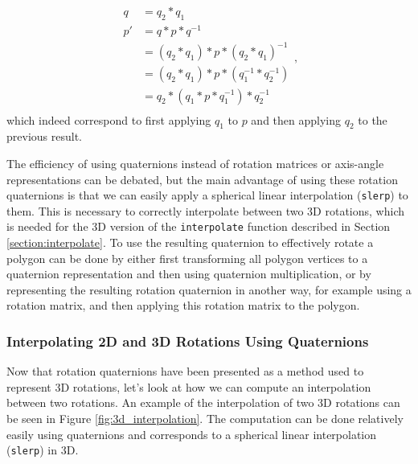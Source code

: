 \begin{equation}
\begin{split}
    q   & = q_2*q_1 \\
    p'  & = q*p*q^{-1} \\
        & = (q_2*q_1)*p*(q_2*q_1)^{-1} \\
        & =  (q_2*q_1)*p*(q_1^{-1}*q_2^{-1}) \\
        & = q_2*(q_1*p*q_1^{-1})*q_2^{-1} \\
\end{split}, 
\end{equation}
which indeed correspond to first applying \( q_1 \) to \( p \) and then applying \( q_2 \) to the previous result.

The efficiency of using quaternions instead of rotation matrices or axis-angle representations can be debated, but the main advantage of using these rotation quaternions is that we can easily apply a spherical linear interpolation (\lstinline{slerp}) to them. This is necessary to correctly interpolate between two 3D rotations, which is needed for the 3D version of the \lstinline{interpolate} function described in Section \ref{section:interpolate}. To use the resulting quaternion to effectively rotate a polygon can be done by either first transforming all polygon vertices to a quaternion representation and then using quaternion multiplication, or by representing the resulting rotation quaternion in another way, for example using a rotation matrix, and then applying this rotation matrix to the polygon.

\subsubsection{Interpolating 2D and 3D Rotations Using Quaternions}

Now that rotation quaternions have been presented as a method used to represent 3D rotations, let's look at how we can compute an interpolation between two rotations. An example of the interpolation of two 3D rotations can be seen in Figure \ref{fig:3d_interpolation}. The computation can be done relatively easily using quaternions and corresponds to a spherical linear interpolation (\lstinline{slerp}) in 3D.

